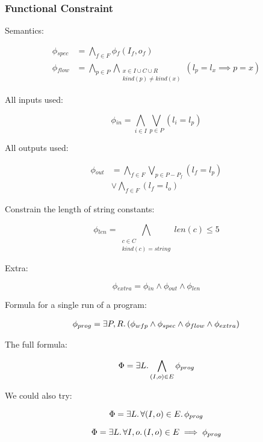 \subsubsection{Functional Constraint}
\label{sec:functional-constraint}




Semantics:

\begin{align*}
  \phi{}_{spec} &= \bigwedge_{f \in F} \phi{}_f (I_f, o_f) \\
  \phi{}_{flow} &= \bigwedge_{p \in P}\bigwedge_{\substack{x \in I \cup C \cup R \\ kind(p) \neq kind(x)}} (l_p = l_x \implies p = x)
\end{align*}

All inputs used:

\[ \phi{}_{in} = \bigwedge_{i \in I}\bigvee_{p \in P}(l_i = l_p) \]

All outputs used:

\begin{align*}
  \phi{}_{out} &= \bigwedge_{f \in F}\bigvee_{p \in P - P_f}(l_f = l_p) \\
               &\vee \bigwedge_{f \in F} (l_f = l_o)
\end{align*}

Constrain the length of string constants:

\[
  \phi{}_{len} = \bigwedge_{\substack{c \in C \\ kind(c) = string}} len(c) \leq 5
\]

Extra:

\[ \phi{}_{extra} = \phi{}_{in} \wedge \phi{}_{out} \wedge \phi{}_{len} \]

Formula for a single run of a program:

\begin{align*}
  \phi{}_{prog} = \exists P,R\ldotp (\phi{}_{wfp} \wedge \phi{}_{spec} \wedge
  \phi{}_{flow} \wedge \phi{}_{extra})
\end{align*}

The full formula:

\[
  \Phi{} = \exists L\ldotp \bigwedge_{(I, o) \in E}\phi{}_{prog}
\]

We could also try:

\[
  \Phi{} = \exists L\ldotp \forall (I, o) \in E \ldotp \phi{}_{prog}
\]

\[
  \Phi{} = \exists L\ldotp \forall I, o \ldotp (I, o) \in E \implies \phi{}_{prog}
\]



